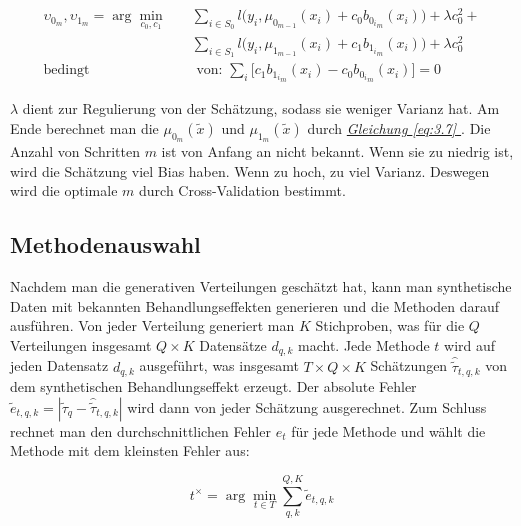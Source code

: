 \documentclass[12pt,a4paper,twoside]{scrartcl}
\numberwithin{equation}{section}
\renewcommand*{\refeq}[1]{\emph{\hyperref[#1]{Gleichung \ref*{#1} }}}
\begin{document}
\begin{equation}\label{eq:3.11}
\begin{split}
	\upsilon_{0_m},\upsilon_{1_m} = \arg\min_{c_0,c_1} \quad &\sum_{i \in S_0} l \big (y_i,\mu_{0_{m-1}}(x_i) + c_0  b_{{0_i}_m}(x_i) \big ) + \lambda c_0^2 + \\
 &\sum_{i \in S_1} l \big (y_i,\mu_{1_{m-1}}(x_i) + c_1  b_{{1_i}_m}(x_i) \big ) + \lambda c_0^2\\
  \text{bedingt}& \text{ von: } \sum_i \big [c_1 b_{{1_i}_m}(x_i) - c_0 b_{{0_i}_m}(x_i) \big ] = 0
\end{split}
\end{equation}
  	
\noindent
 $\lambda$ dient zur Regulierung von der Schätzung, sodass sie weniger Varianz hat. Am Ende berechnet man die $\mu_{0_m}(\tilde{x})$ und $\mu_{1_m}(\tilde{x})$ durch \refeq{eq:3.7}. Die Anzahl von Schritten $m$ ist von Anfang an nicht bekannt. Wenn sie zu niedrig ist, wird die Schätzung viel Bias haben. Wenn zu hoch, zu viel Varianz. Deswegen wird die optimale $m$ durch Cross-Validation bestimmt\cite{schuler2017synth}.\par
    	
\subsection{Methodenauswahl}\label{subsec:methodenauswahl}

Nachdem man die generativen Verteilungen geschätzt hat, kann man synthetische Daten mit bekannten Behandlungseffekten generieren und die Methoden darauf ausführen. Von jeder Verteilung generiert man $K$ Stichproben, was für die $Q$ Verteilungen  insgesamt $Q \times K$ Datensätze $d_{q,k}$ macht. Jede Methode $t$ wird auf jeden Datensatz $d_{q,k}$ ausgeführt, was insgesamt  $T \times Q \times K$ Schätzungen $\hat{\tilde{\tau}}_{t,q,k}$ von dem synthetischen Behandlungseffekt erzeugt. Der absolute Fehler $\tilde{e}_{t,q,k} = |\tilde{\tau}_q - \hat{\tilde{\tau}}_{t,q,k}|$ wird dann von jeder Schätzung ausgerechnet. Zum Schluss rechnet man den durchschnittlichen Fehler $e_t$ für jede Methode und wählt die Methode mit dem kleinsten Fehler aus\cite{schuler2017synth}:\par

\begin{equation}\label{eq:3.12}
 t^{\times} = \arg\min_{t \in T} \sum_{q,k}^{Q,K} \tilde{e}_{t,q,k}
\end{equation}
\clearpage
\end{document}
